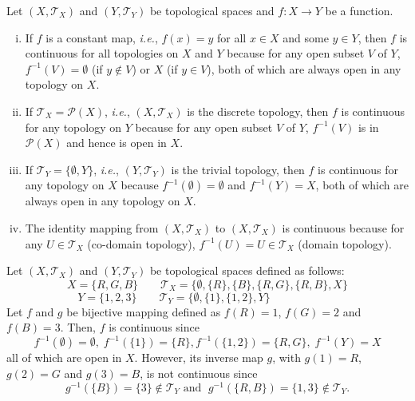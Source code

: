 \documentclass[a4paper,english,12pt]{article}
\begin{document}
\begin{exmp}
Let $(X,\mathcal{T}_X)$ and $(Y,\mathcal{T}_Y)$ be topological spaces and $f:X\rightarrow Y$ be a function.
\begin{enumerate}[i)]
\item If $f$ is a constant map, \emph{i.e.}, $f(x)=y$ for all $x\in X$ and some $y\in Y$, then $f$ is continuous for all topologies on $X$ and $Y$ because for any open subset $V$ of $Y$, $f^{-1}(V)=\emptyset$ (if $y\notin V$) or $X$ (if $y\in V$), both of which are always open in any topology on $X$.
\item If $\mathcal{T}_X=\mathcal{P}(X)$, \emph{i.e.}, $(X,\mathcal{T}_X)$ is the discrete topology, then $f$ is continuous for any topology on $Y$ because for any open subset $V$ of $Y$, $f^{-1}(V)$ is in $\mathcal{P}(X)$ and hence is open in $X$.
\item If $\mathcal{T}_Y=\{\emptyset,Y\}$, \emph{i.e.}, $(Y,\mathcal{T}_Y)$ is the trivial topology, then $f$ is continuous for any topology on $X$ because $f^{-1}(\emptyset)=\emptyset$ and $f^{-1}(Y)=X$, both of which are always open in any topology on $X$.
\item The identity mapping from $(X,\mathcal{T}_X)$ to $(X,\mathcal{T}_X)$ is continuous because for any $U\in \mathcal{T}_X$ (co-domain topology), $f^{-1}(U)=U\in \mathcal{T}_X$ (domain topology).
\end{enumerate}
\label{many_ex}
\end{exmp}

\begin{exmp}
\item Let $(X,\mathcal{T}_X)$ and $(Y,\mathcal{T}_Y)$ be topological spaces defined as follows: 
\begin{equation*}
X=\{R,G,B\} \qquad \mathcal{T}_X=\{\emptyset,\{R\},\{B\},\{R,G\},\{R,B\},X\}
\end{equation*}
\begin{equation*}
Y=\{1,2,3\} \qquad  \mathcal{T}_Y=\{\emptyset,\{1\},\{1,2\},Y\} \qquad \qquad \qquad
\end{equation*}
Let $f$ and $g$ be bijective mapping defined as $f(R)=1$, $f(G)=2$ and $f(B)=3$. Then, $f$ is continuous since 
\begin{equation*}
f^{-1}(\emptyset)=\emptyset, \; f^{-1}(\{1\})=\{R\}, f^{-1}(\{1,2\})=\{R,G\}, \; f^{-1}(Y)=X 
\end{equation*}
all of which are open in $X$. However, its inverse map $g$, with $g(1)=R$, $g(2)=G$ and $g(3)=B$, is not continuous since 
\begin{equation*}
g^{-1}(\{B\})=\{3\}\notin \mathcal{T}_Y \text{ and } \; g^{-1}(\{R,B\})=\{1,3\}\notin \mathcal{T}_Y.
\end{equation*}
\label{inv_discont}
\end{exmp}
\end{document}
